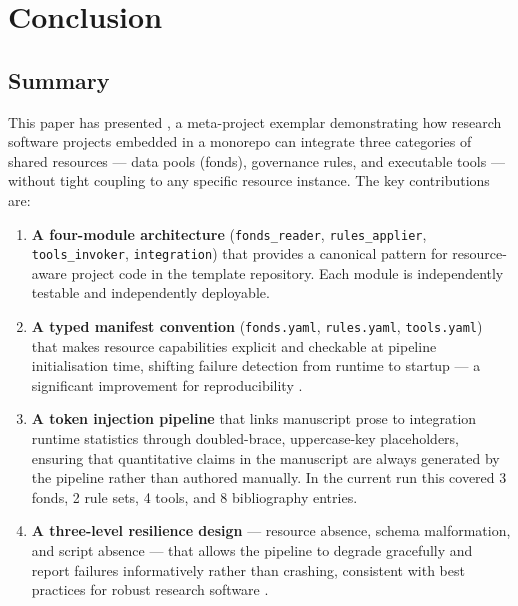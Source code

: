 \documentclass[
]{article}
\begin{document}
\newpage

\section{Conclusion}\label{sec:conclusion}

\subsection{Summary}\label{summary}

This paper has presented , a
meta-project exemplar demonstrating how research software projects
embedded in a monorepo can integrate three categories of shared
resources --- data pools (fonds), governance rules, and executable tools
--- without tight coupling to any specific resource instance. The key
contributions are:

\begin{enumerate}
\def\labelenumi{\arabic{enumi}.}
\item
  \textbf{A four-module architecture} (\texttt{fonds\_reader},
  \texttt{rules\_applier}, \texttt{tools\_invoker},
  \texttt{integration}) that provides a canonical pattern for
  resource-aware project code in the template repository. Each module is
  independently testable and independently deployable.
\item
  \textbf{A typed manifest convention} (\texttt{fonds.yaml},
  \texttt{rules.yaml}, \texttt{tools.yaml}) that makes resource
  capabilities explicit and checkable at pipeline initialisation time,
  shifting failure detection from runtime to startup --- a significant
  improvement for reproducibility \citep{Wilson2014best}.
\item
  \textbf{A token injection pipeline} that links manuscript prose to
  integration runtime statistics through doubled-brace, uppercase-key
  placeholders, ensuring that quantitative claims in the manuscript are
  always generated by the pipeline rather than authored manually. In the
  current run this covered 3 fonds, 2 rule sets, 4 tools, and 8
  bibliography entries.
\item
  \textbf{A three-level resilience design} --- resource absence, schema
  malformation, and script absence --- that allows the pipeline to
  degrade gracefully and report failures informatively rather than
  crashing, consistent with best practices for robust research software
  \citep{Taschuk2017ten}.
\end{enumerate}
\end{document}
